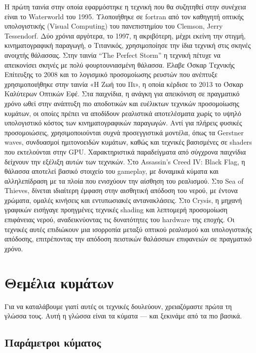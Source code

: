 \documentclass[a4paper, 11pt]{article}
\begin{document}
Η πρώτη ταινία στην οποία εφαρμόστηκε η τεχνική που θα συζητηθεί στην
συνέχεια είναι το Waterworld του 1995. Υλοποιήθηκε σε fortran από τον
καθηγητή οπτικής υπολογιστικής (Visual Computing) του πανεπιστημίου του
Clemson, Jerry Tessendorf. Δύο χρόνια αργότερα, το 1997, η ακριβότερη,
μέχρι εκείνη την στιγμή, κινηματογραφική παραγωγή, ο Τιτανικός,
χρησιμοποίησε την ίδια τεχνική στις σκηνές ανοιχτής θάλασσας. Στην
ταινία ``The Perfect Storm'' η τεχνική πέτυχε να απεικονίσει σκηνές με
πολύ φουρτουνιασμένη θάλασσα. Έλαβε Όσκαρ Τεχνικής Επίτευξης το 2008 και
το λογισμικό προσομοίωσης ρευστών που ανέπτυξε χρησιμοποιήθηκε στην
ταινία «Η Ζωή του Πι», η οποία κέρδισε το 2013 το Όσκαρ Καλύτερων
Οπτικών Εφέ. Στα παιχνίδια, η ανάγκη για απεικόνιση σε πραγματικό χρόνο
ωθεί στην ανάπτυξη πιο αποδοτικών και ευέλικτων τεχνικών προσομοίωσης
κυμάτων, οι οποίες πρέπει να αποδίδουν ρεαλιστικά αποτελέσματα χωρίς το
υψηλό υπολογιστικό κόστος των κινηματογραφικών παραγωγών. Αντί για
πλήρεις φυσικές προσομοιώσεις, χρησιμοποιούνται συχνά προσεγγιστικά
μοντέλα, όπως τα Gerstner waves, συνδυασμοί ημιτονοειδών κυμάτων, καθώς
και τεχνικές βασισμένες σε shaders που εκτελούνται στην GPU.
Χαρακτηριστικά παραδείγματα από σύγχρονα παιχνίδια δείχνουν την εξέλιξη
αυτών των τεχνικών. Στο Assassin's Creed IV: Black Flag, η θάλασσα
αποτελεί βασικό στοιχείο του gameplay, με δυναμικά κύματα και
αλληλεπίδραση με τα πλοία που ενισχύουν την αίσθηση του ρεαλισμού. Στο
Sea of Thieves, δίνεται ιδιαίτερη έμφαση στην αισθητική απόδοση του
νερού, με έντονα χρώματα, ομαλές κινήσεις και εντυπωσιακές
αντανακλάσεις. Στο Crysis, η μηχανή γραφικών εισήγαγε προηγμένες
τεχνικές shading και λεπτομερή προσομοίωση επιφάνειας νερού,
αναδεικνύοντας τις δυνατότητες του hardware της εποχής. Οι τεχνικές
αυτές επιδιώκουν μια ισορροπία μεταξύ οπτικού ρεαλισμού και
υπολογιστικής απόδοσης, επιτρέποντας την απόδοση πειστικών θαλάσσιων
επιφανειών σε πραγματικό χρόνο.

\section{Θεμέλια
κυμάτων}\label{ux3b8ux3b5ux3bcux3adux3bbux3b9ux3b1-ux3baux3c5ux3bcux3acux3c4ux3c9ux3bd}

Για να καταλάβουμε γιατί αυτές οι τεχνικές δουλεύουν, χρειαζόμαστε πρώτα
τη γλώσσα τους. Αυτή η γλώσσα είναι τα κύματα --- και ξεκινάμε από τα
πιο βασικά.

\subsection{Παράμετροι
κύματος}\label{ux3c0ux3b1ux3c1ux3acux3bcux3b5ux3c4ux3c1ux3bfux3b9-ux3baux3cdux3bcux3b1ux3c4ux3bfux3c2}
\end{document}
